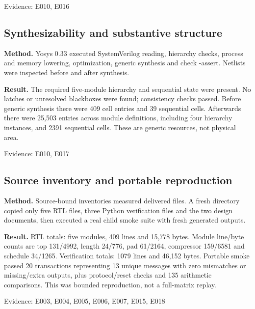 \documentclass[11pt,a4paper]{article}
\begin{document}
{\small Evidence: E010,\allowbreak{} E016}

\subsection{Synthesizability and substantive structure}

\textbf{Method.} Yosys 0.33 executed SystemVerilog reading,\allowbreak{} hierarchy checks,\allowbreak{} process and memory lowering,\allowbreak{} optimization,\allowbreak{} generic synthesis and check -assert. Netlists were inspected before and after synthesis.

\textbf{Result.} The required five-module hierarchy and sequential state were present. No latches or unresolved blackboxes were found; consistency checks passed. Before generic synthesis there were 409 cell entries and 39 sequential cells. Afterwards there were 25,\allowbreak{}503 entries across module definitions,\allowbreak{} including four hierarchy instances,\allowbreak{} and 2391 sequential cells. These are generic resources,\allowbreak{} not physical area.

{\small Evidence: E010,\allowbreak{} E017}

\subsection{Source inventory and portable reproduction}

\textbf{Method.} Source-bound inventories measured delivered files. A fresh directory copied only five RTL files,\allowbreak{} three Python verification files and the two design documents,\allowbreak{} then executed a real child smoke suite with fresh generated outputs.

\textbf{Result.} RTL totals: five modules,\allowbreak{} 409 lines and 15,\allowbreak{}778 bytes. Module line/\allowbreak{}byte counts are top 131/\allowbreak{}4992,\allowbreak{} length 24/\allowbreak{}776,\allowbreak{} pad 61/\allowbreak{}2164,\allowbreak{} compressor 159/\allowbreak{}6581 and schedule 34/\allowbreak{}1265. Verification totals: 1079 lines and 46,\allowbreak{}152 bytes. Portable smoke passed 20 transactions representing 13 unique messages with zero mismatches or missing/\allowbreak{}extra outputs,\allowbreak{} plus protocol/\allowbreak{}reset checks and 135 arithmetic comparisons. This was bounded reproduction,\allowbreak{} not a full-matrix replay.

{\small Evidence: E003,\allowbreak{} E004,\allowbreak{} E005,\allowbreak{} E006,\allowbreak{} E007,\allowbreak{} E015,\allowbreak{} E018}
\end{document}
